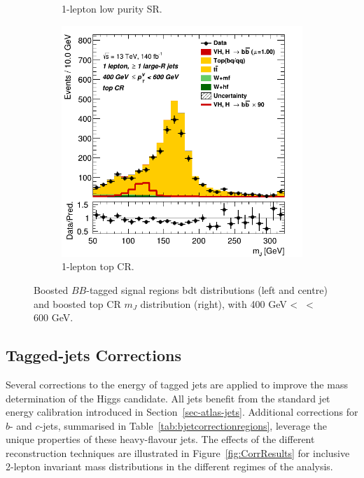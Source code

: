 \begin{figure}[h!]
\begin{subfigure}[b]{0.32\textwidth}
      \caption{1-lepton low purity SR.}
      \label{fig:plots_VHboost_ex_1L_SR}
  \end{subfigure}
  \begin{subfigure}[b]{0.32\textwidth}
    \centering
    \includegraphics[width=\textwidth]{Images/VH/Own_fit/prefit_VHbb/Region_distmBB_BMax600_BMin400_incFat1_Fat1_DSRtopaddbjetcr_J0_TTypebb_incJet1_T2_L1_Y6051_Prefit.png}
    \caption{1-lepton top CR.}
    \label{fig:plots_VHboost_ex_1L_top}
\end{subfigure}
  \caption{Boosted $BB$-tagged signal regions \gls{bdt} distributions (left and centre) and boosted top CR $m_J$ distribution (right), with 400 GeV < \ptv\ < 600 GeV.}
  \label{fig:plots_VHboost_ex}
\end{figure} 

\subsection{Tagged-jets Corrections}\label{sec-vh-jetcor}
Several corrections to the energy of tagged jets are applied to improve the mass determination of the Higgs candidate. All jets benefit from the standard jet energy calibration introduced in Section~\ref{sec-atlas-jets}. Additional corrections for $b$- and $c$-jets, summarised in Table~\ref{tab:bjetcorrectionregions}, leverage the unique properties of these heavy-flavour jets. The effects of the different reconstruction techniques are illustrated in Figure~\ref{fig:CorrResults} for inclusive 2-lepton invariant mass distributions in the different regimes of the analysis. \\

